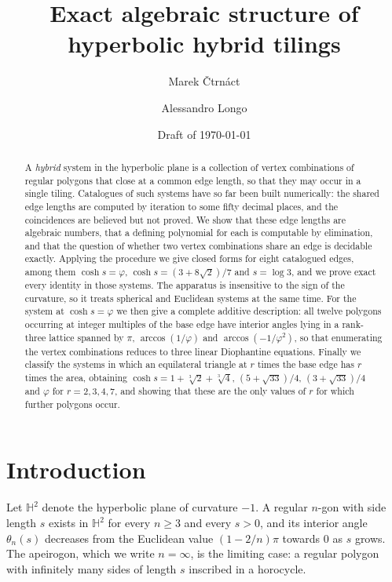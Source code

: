 \documentclass[11pt,a4paper]{article}
\title{Exact algebraic structure of hyperbolic hybrid tilings}
\author{Marek \v{C}trn\'{a}ct \and Alessandro Longo}
\date{Draft of \today}
\theoremstyle{plain}
\theoremstyle{definition}
\theoremstyle{remark}
\newcommand{\HH}{\mathbb{H}^2}
\begin{document}
\maketitle

\begin{abstract}
A \emph{hybrid} system in the hyperbolic plane is a collection of vertex
combinations of regular polygons that close at a common edge length, so that they
may occur in a single tiling. Catalogues of such systems have so far been built
numerically: the shared edge lengths are computed by iteration to some fifty
decimal places, and the coincidences are believed but not proved. We show that
these edge lengths are algebraic numbers, that a defining polynomial for each is
computable by elimination, and that the question of whether two vertex
combinations share an edge is decidable exactly. Applying the procedure we give
closed forms for eight catalogued edges, among them
$\cosh s=\varphi$, $\cosh s=(3+8\sqrt2)/7$ and $s=\log 3$, and we prove exact
every identity in those systems. The apparatus is insensitive to the sign of the
curvature, so it treats spherical and Euclidean systems at the same time. For the system at $\cosh s=\varphi$ we then give
a complete additive description: all twelve polygons occurring at integer
multiples of the base edge have interior angles lying in a rank-three lattice
spanned by $\pi$, $\arccos(1/\varphi)$ and $\arccos(-1/\varphi^{2})$, so that
enumerating the vertex combinations reduces to three linear Diophantine
equations. Finally we classify the systems in which an equilateral triangle at
$r$ times the base edge has $r$ times the area, obtaining
$\cosh s=1+\sqrt[3]{2}+\sqrt[3]{4}$, $(5+\sqrt{33})/4$, $(3+\sqrt{33})/4$ and
$\varphi$ for $r=2,3,4,7$, and showing that these are the only values of $r$ for
which further polygons occur.
\end{abstract}

\section{Introduction}

Let $\HH$ denote the hyperbolic plane of curvature $-1$. A regular $n$-gon with
side length $s$ exists in $\HH$ for every $n\ge 3$ and every $s>0$, and its
interior angle $\theta_n(s)$ decreases from the Euclidean value
$(1-2/n)\pi$ towards $0$ as $s$ grows. The apeirogon, which we write $n=\infty$,
is the limiting case: a regular polygon with infinitely many sides of length $s$
inscribed in a horocycle.
\end{document}
